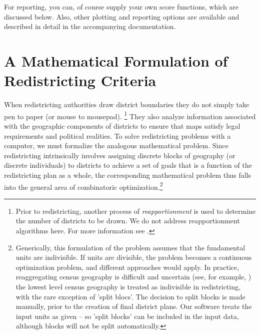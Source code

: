 \documentclass[article]{JSSstyle/jss}
\begin{document}
For reporting, you can, of course supply your own score functions, which are discussed below. Also, other plotting and reporting options are available and described in detail in the accompanying documentation.  

\section{A Mathematical Formulation of Redistricting Criteria}

When redistricting authorities draw district boundaries they do not 
simply take pen to paper (or mouse to mousepad). \footnote{Prior to redistricting, another process of \emph{reapportionment} is used to determine the number of districts to be drawn. We do not address reapportionment algorithms here. For more information see \citet{BalYoung01}.}  They also analyze information associated with the geographic 
components of districts to ensure that maps satisfy legal requirements and political realities. 
To solve redistricting problems with a computer, we must 
formalize the  analogous mathematical problem.  Since redistricting 
intrinsically involves assigning discrete blocks of geography (or 
discrete individuals) to districts to achieve a set of goals that is a function 
of the redistricting plan as a whole, the corresponding mathematical 
problem thus falls into the general area of combinatoric optimization.\footnote{Generically, this formulation of the problem assumes that the fundamental units are indivisible. If units are divisible, the problem becomes a continuous optimization problem, and different approaches would apply. In practice, reaggregating census geography is difficult and uncertain (see, for example, \citet{ROAD}) the lowest level census geography is treated as indivisible in redistricting, with the rare exception of 'split blocs'.  The decision to split blocks is made manually, prior to the creation of final district plans. Our software treats the input units as given -- so 'split blocks' can be included in the input data, although blocks will not be split automatically.  }
\end{document}
